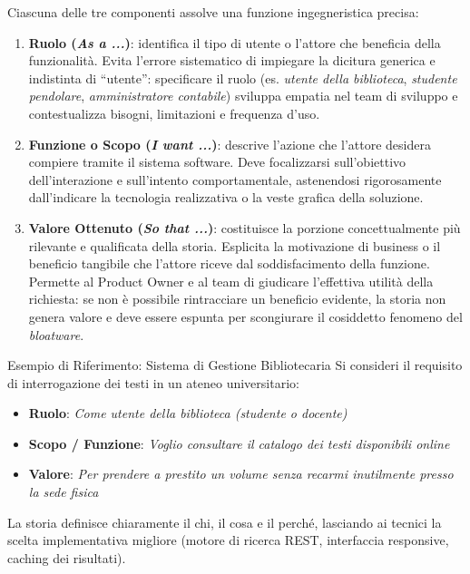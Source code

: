 \documentclass[12pt]{extarticle}
\begin{document}
\noindent Ciascuna delle tre componenti assolve una funzione ingegneristica precisa:
\begin{enumerate}
    \item \textbf{Ruolo (\textit{As a ...})}: identifica il tipo di utente o l'attore che beneficia della funzionalità. Evita l'errore sistematico di impiegare la dicitura generica e indistinta di ``utente'': specificare il ruolo (es. \textit{utente della biblioteca}, \textit{studente pendolare}, \textit{amministratore contabile}) sviluppa empatia nel team di sviluppo e contestualizza bisogni, limitazioni e frequenza d'uso.
    \item \textbf{Funzione o Scopo (\textit{I want ...})}: descrive l'azione che l'attore desidera compiere tramite il sistema software. Deve focalizzarsi sull'obiettivo dell'interazione e sull'intento comportamentale, astenendosi rigorosamente dall'indicare la tecnologia realizzativa o la veste grafica della soluzione.
    \item \textbf{Valore Ottenuto (\textit{So that ...})}: costituisce la porzione concettualmente più rilevante e qualificata della storia. Esplicita la motivazione di business o il beneficio tangibile che l'attore riceve dal soddisfacimento della funzione. Permette al Product Owner e al team di giudicare l'effettiva utilità della richiesta: se non è possibile rintracciare un beneficio evidente, la storia non genera valore e deve essere espunta per scongiurare il cosiddetto fenomeno del \textit{bloatware}.
\end{enumerate}

\begin{cbox}{Esempio di Riferimento: Sistema di Gestione Bibliotecaria}
\noindent Si consideri il requisito di interrogazione dei testi in un ateneo universitario:
\begin{itemize}
    \item \textbf{Ruolo}: \textit{Come utente della biblioteca (studente o docente)}
    \item \textbf{Scopo / Funzione}: \textit{Voglio consultare il catalogo dei testi disponibili online}
    \item \textbf{Valore}: \textit{Per prendere a prestito un volume senza recarmi inutilmente presso la sede fisica}
\end{itemize}
La storia definisce chiaramente il chi, il cosa e il perché, lasciando ai tecnici la scelta implementativa migliore (motore di ricerca REST, interfaccia responsive, caching dei risultati).
\end{cbox}
\end{document}
